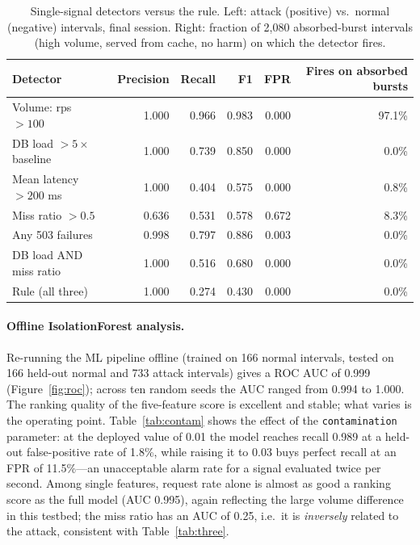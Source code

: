 \begin{table}[t]
\centering
\caption{Single-signal detectors versus the rule. Left: attack (positive) vs.\ normal
(negative) intervals, final session. Right: fraction of 2{,}080 absorbed-burst
intervals (high volume, served from cache, no harm) on which the detector fires.}
\label{tab:single}
\small
\begin{tabular}{@{}lrrrr|r@{}}
\toprule
Detector & Precision & Recall & F1 & FPR & Fires on absorbed bursts \\
\midrule
Volume: rps $>100$ & 1.000 & 0.966 & 0.983 & 0.000 & 97.1\% \\
DB load $>5\times$ baseline & 1.000 & 0.739 & 0.850 & 0.000 & 0.0\% \\
Mean latency $>200$ ms & 1.000 & 0.404 & 0.575 & 0.000 & 0.8\% \\
Miss ratio $>0.5$ & 0.636 & 0.531 & 0.578 & 0.672 & 8.3\% \\
Any 503 failures & 0.998 & 0.797 & 0.886 & 0.003 & 0.0\% \\
DB load AND miss ratio & 1.000 & 0.516 & 0.680 & 0.000 & 0.0\% \\
Rule (all three) & 1.000 & 0.274 & 0.430 & 0.000 & 0.0\% \\
\bottomrule
\end{tabular}
\end{table}

\paragraph{Offline IsolationForest analysis.} Re-running the ML pipeline offline
(trained on 166 normal intervals, tested on 166 held-out normal and 733 attack
intervals) gives a ROC AUC of 0.999 (Figure~\ref{fig:roc}); across ten random seeds
the AUC ranged from 0.994 to 1.000. The ranking quality of the five-feature score is
excellent and stable; what varies is the operating point. Table~\ref{tab:contam} shows
the effect of the \texttt{contamination} parameter: at the deployed value of 0.01 the
model reaches recall 0.989 at a held-out false-positive rate of 1.8\%, while raising it
to 0.03 buys perfect recall at an FPR of 11.5\%---an unacceptable alarm rate for a
signal evaluated twice per second. Among single features, request rate alone is
almost as good a ranking score as the full model (AUC 0.995), again reflecting the
large volume difference in this testbed; the miss ratio has an AUC of 0.25, i.e.\ it is
\emph{inversely} related to the attack, consistent with Table~\ref{tab:three}.

